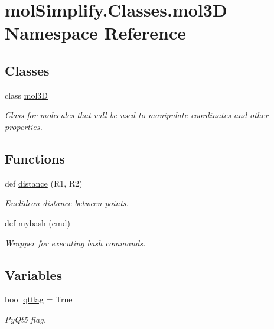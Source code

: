 \hypertarget{namespacemolSimplify_1_1Classes_1_1mol3D}{}\section{mol\+Simplify.\+Classes.\+mol3D Namespace Reference}
\label{namespacemolSimplify_1_1Classes_1_1mol3D}
\subsection*{Classes}
\begin{DoxyCompactItemize}
\item 
class \hyperlink{classmolSimplify_1_1Classes_1_1mol3D_1_1mol3D}{mol3D}
\begin{DoxyCompactList}\small\item\em Class for molecules that will be used to manipulate coordinates and other properties. \end{DoxyCompactList}\end{DoxyCompactItemize}
\subsection*{Functions}
\begin{DoxyCompactItemize}
\item 
def \hyperlink{namespacemolSimplify_1_1Classes_1_1mol3D_a517d7e895fbb12b1047664977f0e7113}{distance} (R1, R2)
\begin{DoxyCompactList}\small\item\em Euclidean distance between points. \end{DoxyCompactList}\item 
def \hyperlink{namespacemolSimplify_1_1Classes_1_1mol3D_ac1fc503c0bd616235eeb5b74a5caeb3e}{mybash} (cmd)
\begin{DoxyCompactList}\small\item\em Wrapper for executing bash commands. \end{DoxyCompactList}\end{DoxyCompactItemize}
\subsection*{Variables}
\begin{DoxyCompactItemize}
\item 
bool \hyperlink{namespacemolSimplify_1_1Classes_1_1mol3D_a90f0c563b9ba5b490cd9884407a70c54}{qtflag} = True
\begin{DoxyCompactList}\small\item\em Py\+Qt5 flag. \end{DoxyCompactList}\end{DoxyCompactItemize}


